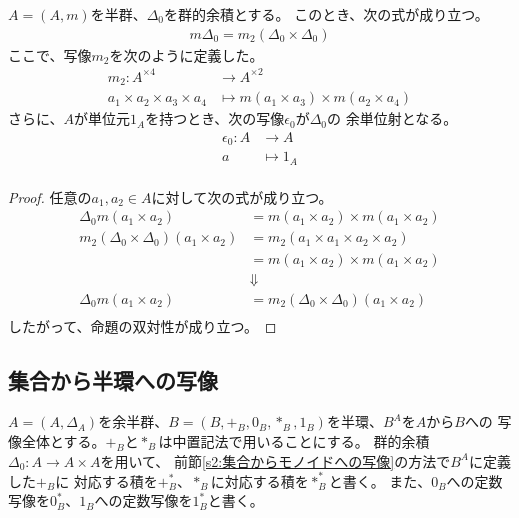 \begin{proposition}[群的余積の双対性]\label{pro:群的余積の双対性} %
$A=(A,m)$を半群、$\Delta_0$を群的余積とする。
このとき、次の式が成り立つ。
\begin{equation*}\begin{split} %
	m\Delta_0 = m_2(\Delta_0 \times \Delta_0)
\end{split}\end{equation*} %
ここで、写像$m_2$を次のように定義した。
\begin{equation*}\begin{split} %
	m_2: A^{\times4} &\to A^{\times2} \\
		a_1 \times a_2 \times a_3 \times a_4 &\mapsto m(a_1 \times a_3) \times m(a_2 \times a_4) 
\end{split}\end{equation*} %
さらに、$A$が単位元$1_A$を持つとき、次の写像$\epsilon_0$が$\Delta_0$の
余単位射となる。
\begin{equation*}\begin{split} %
	\epsilon_0: A &\to A \\
		a &\mapsto 1_A \\
\end{split}\end{equation*} %
\end{proposition} %
\begin{proof} %
任意の$a_1,a_2\in A$に対して次の式が成り立つ。
\begin{equation*}\begin{split} %
	\Delta_0m(a_1\times a_2) &= m(a_1\times a_2)\times m(a_1\times a_2) \\
	m_2(\Delta_0\times \Delta_0)(a_1\times a_2) &= m_2(a_1\times a_1\times a_2\times a_2) \\
		&= m(a_1\times a_2)\times m(a_1\times a_2) \\
	& \Downarrow \\
	\Delta_0m(a_1\times a_2) &= m_2(\Delta_0\times \Delta_0)(a_1\times a_2) \\
\end{split}\end{equation*} %
したがって、命題の双対性が成り立つ。
\end{proof} %

\subsection{集合から半環への写像}\label{s2:集合から半環への写像} %
$A=(A,\Delta_A)$を余半群、$B=(B,+_B,0_B,*_B,1_B)$を半環、$B^A$を$A$から$B$への
写像全体とする。$+_B$と$*_B$は中置記法で用いることにする。
群的余積$\Delta_0:A\to A\times A$を用いて、
前節\ref{s2:集合からモノイドへの写像}の方法で$B^A$に定義した$+_B$に
対応する積を$+_B^*$、$*_B$に対応する積を$*_B^*$と書く。
また、$0_B$への定数写像を$0_B^*$、$1_B$への定数写像を$1_B^*$と書く。

